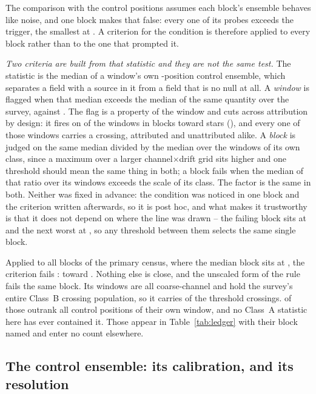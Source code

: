The comparison with the control positions assumes each block's ensemble
behaves like noise, and one block makes that false: every one of its \NCtrl{}
probes exceeds the trigger, the smallest at \BqFailCtrlMin. A criterion for
the condition is therefore applied to every block rather than to the one that
prompted it.

\emph{Two criteria are built from that statistic and they are not the same
test.} The statistic is the median of a window's own \NCtrl-position control
ensemble, which separates a field with a source in it from a field that is no
null at all. A \emph{window} is flagged when that median exceeds \BqFactor{}
the median of the same quantity over the survey, \DqThresh{} against
\DqSurvMed. The flag is a property of the window and cuts across attribution
by design: it fires on \DqNWin{} of the \NWindows{} windows in
\BkFlagNBlock{} blocks toward \DqNStar{} stars (\DqStars), and every one of
those windows carries a crossing, attributed and unattributed alike. A
\emph{block} is judged on the same median divided by the median over the
windows of its own class, since a maximum over a larger
channel$\times$drift grid sits higher and one threshold should mean the same
thing in both; a block fails when the median of that ratio over its windows
exceeds \BqFactor{} the scale of its class. The factor is the same in
both. Neither was fixed in advance: the condition
was noticed in one block and the criterion written afterwards, so it is post
hoc, and what makes it trustworthy is that it does not depend on where the
line was drawn -- the failing block sits at \BqFailQ{} and the next worst at
\BqNextQ, so any threshold between them selects the same single block.

Applied to all \BqNBlocks{} blocks of the primary census, where the median
block sits at \BqQMed, the criterion fails \BqNFail: \BqFailBlock{} toward
\BqFailStar. Nothing else is close, and the unscaled form of the rule fails
the same \BqRawNFail{} block. Its \BqFailNWin{} windows are all
coarse-channel and
hold the survey's entire Class~B crossing population, so it carries
\EvNCrossFlag{} of the \EvNCrossRaw{} threshold crossings. \EvNRankFlag{}
of those outrank all \NCtrl{} control positions of their own window, and
no Class~A statistic here has ever contained it. Those \EvNCrossFlag{} appear
in Table~\ref{tab:ledger} with their block named and enter no count
elsewhere.

\subsection{The control ensemble: its calibration, and its resolution}

